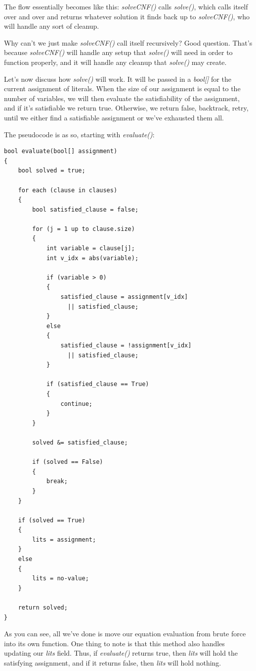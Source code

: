 \documentclass[../main.tex]{subfiles}
\begin{document}
The flow essentially becomes like this: \textit{solveCNF()} calls
\textit{solve()}, which calls itself over and over and returns whatever solution
it finds back up to \textit{solveCNF()}, who will handle any sort of cleanup.

Why can't we just make \textit{solveCNF()} call itself recursively? Good question.
That's because \textit{solveCNF()} will handle any setup that
\textit{solve()} will need in order to function properly, and it will handle any
cleanup that \textit{solve()} may create.

Let's now discuss how \textit{solve()} will work.
It will be passed in a \textit{bool[]} for the current assignment of literals.
When the size of our assignment is equal to the number of variables, we will
then evaluate the satisfiability of the assignment, and if it's satisfiable we
return true. Otherwise, we return false, backtrack, retry, until we either find a
satisfiable assignment or we've exhausted them all.

The pseudocode is as so, starting with \textit{evaluate()}:

\begin{lstlisting}
bool evaluate(bool[] assignment)
{
    bool solved = true;

    for each (clause in clauses)
    {
        bool satisfied_clause = false;

        for (j = 1 up to clause.size)
        {
            int variable = clause[j];
            int v_idx = abs(variable);

            if (variable > 0)
            {
                satisfied_clause = assignment[v_idx]
                  || satisfied_clause;
            }
            else
            {
                satisfied_clause = !assignment[v_idx] 
                  || satisfied_clause;
            }

            if (satisfied_clause == True)
            {
                continue;
            }
        }

        solved &= satisfied_clause;

        if (solved == False)
        {
            break;
        }
    }

    if (solved == True)
    {
        lits = assignment;
    }
    else
    {
        lits = no-value;
    }

    return solved;
}
\end{lstlisting}

As you can see, all we've done is move our equation evaluation from brute force
into its own function. One thing to note is that this method also handles
updating our \textit{lits} field. Thus, if \textit{evaluate()} returns true, then
\textit{lits} will hold the satisfying assignment, and if it returns false, then
\textit{lits} will hold nothing.
\end{document}
